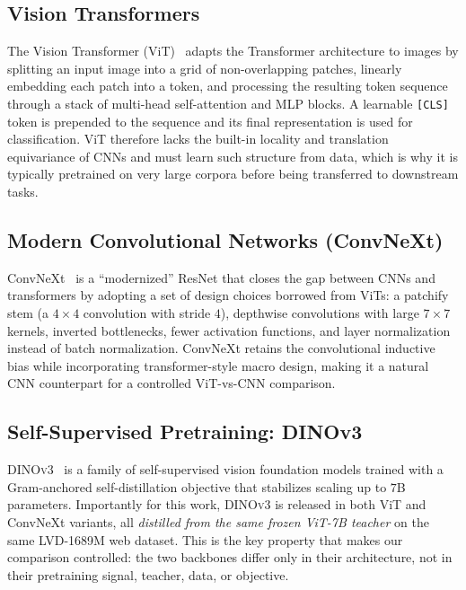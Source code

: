 \documentclass[11pt,a4paper]{article}
\begin{document}
\subsection{Vision Transformers}
The Vision Transformer (ViT)~\cite{dosovitskiy2021vit} adapts the Transformer architecture to
images by splitting an input image into a grid of non-overlapping patches, linearly embedding
each patch into a token, and processing the resulting token sequence through a stack of
multi-head self-attention and MLP blocks. A learnable \texttt{[CLS]} token is prepended to the
sequence and its final representation is used for classification. ViT therefore lacks the
built-in locality and translation equivariance of CNNs and must learn such structure from data,
which is why it is typically pretrained on very large corpora before being transferred to
downstream tasks.

\subsection{Modern Convolutional Networks (ConvNeXt)}
ConvNeXt~\cite{liu2022convnext} is a ``modernized'' ResNet that closes the gap between CNNs and
transformers by adopting a set of design choices borrowed from ViTs: a patchify stem (a $4\times4$
convolution with stride $4$), depthwise convolutions with large $7\times7$ kernels, inverted
bottlenecks, fewer activation functions, and layer normalization instead of batch normalization.
ConvNeXt retains the convolutional inductive bias while incorporating transformer-style macro
design, making it a natural CNN counterpart for a controlled ViT-vs-CNN comparison.

\subsection{Self-Supervised Pretraining: DINOv3}
\textsc{DINOv3}~\cite{dinov3} is a family of self-supervised vision foundation models trained
with a Gram-anchored self-distillation objective that stabilizes scaling up to $7$B parameters.
Importantly for this work, \textsc{DINOv3} is released in both ViT and ConvNeXt variants, all
\emph{distilled from the same frozen ViT-7B teacher} on the same LVD-1689M web dataset. This is
the key property that makes our comparison controlled: the two backbones differ only in their
architecture, not in their pretraining signal, teacher, data, or objective.
\end{document}
